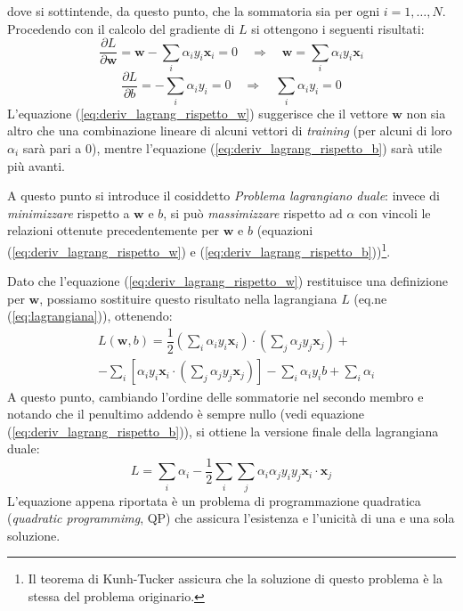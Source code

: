 dove si sottintende, da questo punto, che la sommatoria sia per ogni $i=1,\ldots,N$.
\\
Procedendo con il calcolo del gradiente di $L$ si ottengono i seguenti risultati:
\begin{equation}
\label{eq:deriv_lagrang_rispetto_w}
\dfrac{\partial L}{\partial \mathbf{w}}=\mathbf{w}-\sum_i\alpha_i y_i\mathbf{x}_i=0 \quad\Rightarrow\quad \mathbf{w}=\sum_i\alpha_i y_i\mathbf{x}_i
\end{equation}
\begin{equation}
\label{eq:deriv_lagrang_rispetto_b}
\dfrac{\partial L}{\partial b}=-\sum_i\alpha_iy_i=0 \quad\Rightarrow\quad \sum_i\alpha_iy_i=0
\end{equation}
L'equazione (\ref{eq:deriv_lagrang_rispetto_w}) suggerisce che il vettore $\mathbf{w}$ non sia altro che una combinazione lineare di alcuni vettori di \emph{training} (per alcuni di loro $\alpha_i$ sarà pari a $0$), mentre l'equazione (\ref{eq:deriv_lagrang_rispetto_b}) sarà utile più avanti.

A questo punto si introduce il cosiddetto \textit{Problema lagrangiano duale}: invece di \emph{minimizzare} rispetto a $\mathbf{w}$ e $b$, si può \emph{massimizzare} rispetto ad $\alpha$ con vincoli le relazioni ottenute precedentemente per $\mathbf{w}$ e $b$ (equazioni (\ref{eq:deriv_lagrang_rispetto_w}) e (\ref{eq:deriv_lagrang_rispetto_b}))\footnote{Il teorema di Kunh-Tucker assicura che la soluzione di questo problema è la stessa del problema originario.}.

Dato che l'equazione (\ref{eq:deriv_lagrang_rispetto_w}) restituisce una definizione per $\mathbf{w}$, possiamo sostituire questo risultato nella lagrangiana $L$ (eq.ne (\ref{eq:lagrangiana})), ottenendo:
\begin{eqnarray}\nonumber
\label{eq:lagrangiana_finale1}
&L(\mathbf{w},b)	= \dfrac{1}{2}\left ( \sum_i \alpha_iy_i\mathbf{x}_i \right )\cdot\left (\sum_j\alpha_jy_j\mathbf{x}_j\right )+\\
		&-\sum_i\left [\alpha_iy_i\mathbf{x}_i\cdot\left (\sum_j\alpha_jy_j\mathbf{x}_j\right )\right ]-
		\sum_i\alpha_iy_ib+\sum_i\alpha_i	
\end{eqnarray}
A questo punto, cambiando l'ordine delle sommatorie nel secondo membro e notando che il penultimo addendo è sempre nullo (vedi equazione (\ref{eq:deriv_lagrang_rispetto_b})), si ottiene la versione finale della lagrangiana duale: 
\begin{equation}
\label{eq:langrangiana_finale2}
L=\sum_i\alpha_i-\dfrac{1}{2	}\sum_i\sum_j\alpha_i\alpha_jy_iy_j\mathbf{x}_i\cdot\mathbf{x}_j
\end{equation}
L'equazione appena riportata è un problema di programmazione quadratica (\emph{quadratic programmimg}, QP) che assicura l'esistenza e l'unicità di una e una sola soluzione.\\

